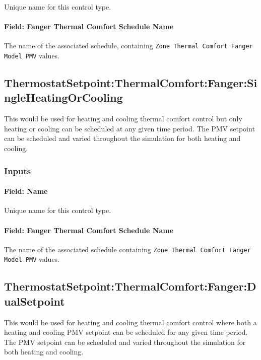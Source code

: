 Unique name for this control type.

\paragraph{Field: Fanger Thermal Comfort Schedule Name}\label{field-fanger-thermal-comfort-schedule-name-1}

The name of the associated schedule, containing \lstinline!Zone Thermal Comfort Fanger Model PMV! values.

\subsection{ThermostatSetpoint:ThermalComfort:Fanger:SingleHeatingOrCooling}\label{thermostatsetpointthermalcomfortfangersingleheatingorcooling}

This would be used for heating and cooling thermal comfort control but only heating or cooling can be scheduled at any given time period. The PMV setpoint can be scheduled and varied throughout the simulation for both heating and cooling.

\subsubsection{Inputs}\label{inputs-12-020}

\paragraph{Field: Name}\label{field-name-10-019}

Unique name for this control type.

\paragraph{Field: Fanger Thermal Comfort Schedule Name}\label{field-fanger-thermal-comfort-schedule-name-2}

The name of the associated schedule containing \lstinline!Zone Thermal Comfort Fanger Model PMV! values.

\subsection{ThermostatSetpoint:ThermalComfort:Fanger:DualSetpoint}\label{thermostatsetpointthermalcomfortfangerdualsetpoint}

This would be used for heating and cooling thermal comfort control where both a heating and cooling PMV setpoint can be scheduled for any given time period. The PMV setpoint can be scheduled and varied throughout the simulation for both heating and cooling.


